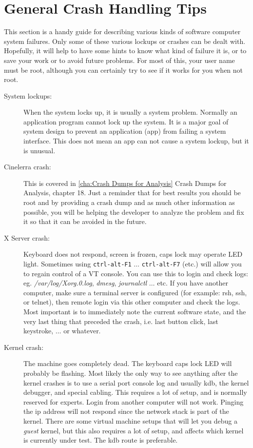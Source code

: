 \section{General Crash Handling Tips}%
\label{sec:general_crash_tips}

This section is a handy guide for describing various kinds of software computer system failures.  Only some of these various lockups or crashes can be dealt with.  Hopefully, it will help to have some hints to know what kind of failure it is, or to save your work or to avoid future problems.  For most of this, your user name must be root, although you can certainly try to see if it works for you when not root.

\begin{description}
	\item[System lockups:] When the system locks up, it is usually a system problem.  Normally an application program cannot lock up the system.  It is a major goal of system design to prevent an application (app) from failing a system interface.  This does not mean an app can not cause a system lockup, but it is unusual.
	\item[Cinelerra crash:] This is covered in  \ref{cha:Crash Dumps for Analysis} Crash Dumps for Analysis, chapter 18.  Just a reminder that for best results you should be root and by providing a crash dump and as much other information as possible, you will be helping the developer to analyze the problem and fix it so that it can be avoided in the future.
	\item[X Server crash:] Keyboard does not respond, screen is frozen, caps lock may operate LED light.  Sometimes using \texttt{ctrl-alt-F1} $\dots$ \texttt{ctrl-alt-F7} (etc.) will allow you to regain control of a VT console.  You can use this to login and check logs: eg. \textit{/var/log/Xorg.0.log}, \textit{dmesg}, \textit{journalctl} $\dots$ etc.  If you have another computer, make sure a terminal server is configured (for example: rsh, ssh, or telnet), then remote login via this other computer and check the logs.  Most important is to immediately note the current software state, and the very last thing that preceded the crash, i.e. last button click, last keystroke, $\dots$ or whatever.
	\item[Kernel crash:] The machine goes completely dead.  The keyboard caps lock LED will probably be flashing.  Most likely the only way to see anything after the kernel crashes is to use a serial port console log and usually kdb, the kernel debugger, and special cabling.  This requires a lot of setup, and is normally reserved for experts.  Login from another computer will not work.  Pinging the ip address will not respond since the network stack is part of the kernel.  There are some virtual machine setups that will let you debug a \textit{guest} kernel, but this also requires a lot of setup, and affects which kernel is currently under test.  The kdb route is preferable.

\end{description}
